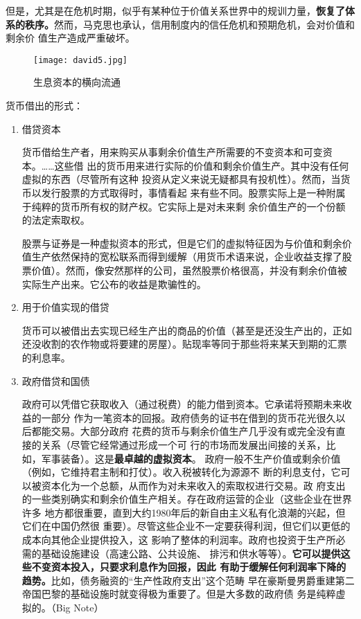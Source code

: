 但是，尤其是在危机时期，似乎有某种位于价值关系世界中的规训力量，\textbf{恢复了体
  系的秩序。}然而，马克思也承认，信用制度内的信任危机和预期危机，会对价值和剩余价
值生产造成严重破坏。


\begin{figure}
\centering
\texttt{[image: david5.jpg]}
\caption{生息资本的横向流通}
\label{fig:david5}
\end{figure}

货币借出的形式：
\begin{enumerate}
\item 借贷资本

  货币借给生产者，用来购买从事剩余价值生产所需要的不变资本和可变资本。……这些借
  出的货币用来进行实际的价值和剩余价值生产。其中没有任何虚拟的东西（尽管所有这种
  投资从定义来说无疑都具有投机性）。然而，当货币以发行股票的方式取得时，事情看起
  来有些不同。股票实际上是一种附属于纯粹的货币所有权的财产权。它实际上是对未来剩
  余价值生产的一个份额的法定索取权。

股票与证券是一种虚拟资本的形式，但是它们的虚拟特征因为与价值和剩余价值生产依然保持的宽松联系而得到缓解（用货币术语来说，企业收益支撑了股票价值）。然而，像安然那样的公司，虽然股票价格很高，并没有剩余价值被实际生产出来。它公布的收益是欺骗性的。

\item 用于价值实现的借贷

  货币可以被借出去实现已经生产出的商品的价值（甚至是还没生产出的，正如还没收割的农作物或将要建的房屋）。贴现率等同于那些将来某天到期的汇票的利息率。

 \item 政府借贷和国债

   政府可以凭借它获取收入（通过税费）的能力借到资本。它承诺将预期未来收益的一部分
   作为一笔资本的回报。政府债务的证书在借到的货币花光很久以后都能交易。大部分政府
   花费的货币与剩余价值生产几乎没有或完全没有直接的关系（尽管它经常通过形成一个可
   行的市场而发展出间接的关系，比如，军事装备）。这是\textbf{最卓越的虚拟资本}。
   政府一般不生产价值或剩余价值（例如，它维持君主制和打仗）。收入税被转化为源源不
   断的利息支付，它可以被资本化为一个总额，从而作为对未来收入的索取权进行交易。政
   府支出的一些类别确实和剩余价值生产相关。存在政府运营的企业（这些企业在世界许多
   地方都很重要，直到大约1980年后的新自由主义私有化浪潮的兴起，但它们在中国仍然很
   重要）。尽管这些企业不一定要获得利润，但它们以更低的成本向其他企业提供投入，这
   影响了整体的利润率。政府也投资于生产所必需的基础设施建设（高速公路、公共设施、
   排污和供水等等）。\textbf{它可以提供这些不变资本投入，只要求利息作为回报，因此
     有助于缓解任何利润率下降的趋势。}比如，债务融资的“生产性政府支出”这个范畴
   早在豪斯曼男爵重建第二帝国巴黎的基础设施时就变得极为重要了。但是大多数的政府债
   务是纯粹虚拟的。（Big Note）


\end{enumerate}
